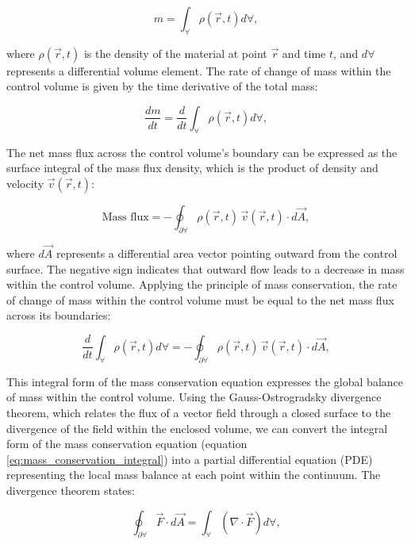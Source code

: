 \documentclass[12pt,a4paper,english]{article}
\begin{document}
\begin{equation}
m = \int_{\forall} \rho(\vec{r}, t) d\forall,
\end{equation}

\noindent
where $\rho(\vec{r}, t)$ is the density of the material at point $\vec{r}$ and time $t$, and $d\forall$ represents a differential volume element.
The rate of change of mass within the control volume is given by the time derivative of the total mass:

\begin{equation}
\frac{dm}{dt} = \frac{d}{dt} \int_{\forall} \rho(\vec{r}, t) d\forall,
\end{equation}

The net mass flux across the control volume's boundary can be expressed as the surface integral of the mass flux density, which is the product of density and velocity $\vec{v}(\vec{r}, t)$:

\begin{equation}
\text{Mass flux} = -\oint_{\partial \forall} \rho(\vec{r}, t) \, \vec{v}(\vec{r}, t) \cdot d\vec{A},
\end{equation}

\noindent
where $d\vec{A}$ represents a differential area vector pointing outward from the control surface. The negative sign indicates that outward flow leads to a decrease in mass within the control volume.
Applying the principle of mass conservation, the rate of change of mass within the control volume must be equal to the net mass flux across its boundaries:

\begin{equation}\label{eq:mass_conservation_integral}
\frac{d}{dt} \int_{\forall} \rho(\vec{r}, t) d\forall = -\oint_{\partial \forall} \rho(\vec{r}, t) \, \vec{v}(\vec{r}, t) \cdot d\vec{A},
\end{equation}

This integral form of the mass conservation equation expresses the global balance of mass within the control volume. Using the Gauss-Ostrogradsky divergence theorem, which relates the flux of a vector field through a closed surface to the divergence of the field within the enclosed volume, we can convert the integral form of the mass conservation equation (equation \ref{eq:mass_conservation_integral}) into a partial differential equation (PDE) representing the local mass balance at each point within the continuum. The divergence theorem states:

\begin{equation}
\oint_{\partial \forall} \vec{F} \cdot d\vec{A} = \int_{\forall} (\nabla \cdot \vec{F}) d\forall,
\end{equation}
\end{document}
